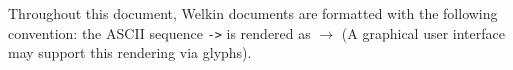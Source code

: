 Throughout this document, Welkin documents are formatted with the following convention: the ASCII sequence \texttt{->} is rendered as $\to$ (A graphical user interface may support this rendering via glyphs). %


